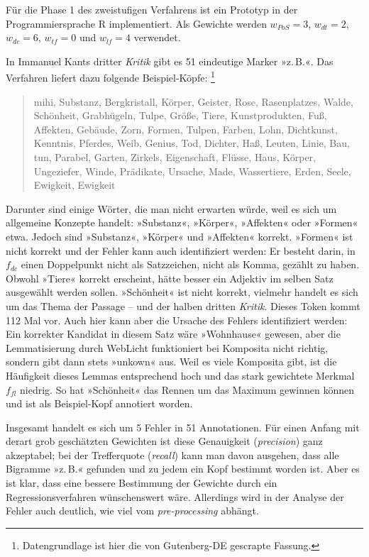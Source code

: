 \documentclass{article}
\newcommand*{\lit}{\textit}%
\newcommand*{\englisch}[1]{\foreignlanguage{english}{\textit{#1}}}%
\begin{document}
Für die Phase 1 des zweistufigen Verfahrens ist ein Prototyp in der
Programmiersprache R implementiert. Als Gewichte werden $w_{PoS}=3$,
$w_{dt}=2$, $w_{dc}=6$, $w_{tf}=0$ und $w_{lf}=4$ verwendet.

In Immanuel Kants dritter \lit{Kritik} gibt es 51 eindeutige Marker
»z.\,B.«. Das Verfahren liefert dazu folgende Beispiel-Köpfe:%
\footnote{Datengrundlage ist hier die von Gutenberg-DE gescrapte
  Fassung.} %
\begin{quote}
  mihi, Substanz, Bergkristall, Körper, Geister, Rose, Rasenplatzes,
  Walde, Schönheit, Grabhügeln, Tulpe, Größe, Tiere, Kunstprodukten,
  Fuß, Affekten, Gebäude, Zorn, Formen, Tulpen, Farben, Lohn,
  Dichtkunst, Kenntnis, Pferdes, Weib, Genius, Tod, Dichter, Haß,
  Leuten, Linie, Bau, tun, Parabel, Garten, Zirkels, Eigenschaft,
  Flüsse, Haus, Körper, Ungeziefer, Winde, Prädikate, Ursache, Made,
  Wassertiere, Erden, Seele, Ewigkeit, Ewigkeit
\end{quote}

Darunter sind einige Wörter, die man nicht erwarten würde, weil es
sich um allgemeine Konzepte handelt: »Substanz«, »Körper«, »Affekten«
oder »Formen« etwa. Jedoch sind »Substanz«, »Körper« und »Affekten«
korrekt. »Formen« ist nicht korrekt und der Fehler kann auch
identifiziert werden: Er besteht darin, in $f_{dc}$ einen Doppelpunkt
nicht als Satzzeichen, nicht als Komma, gezählt zu haben. Obwohl
»Tiere« korrekt erscheint, hätte besser ein Adjektiv im selben Satz
ausgewählt werden sollen. »Schönheit« ist nicht korrekt, vielmehr
handelt es sich um das Thema der Passage -- und der halben dritten
\lit{Kritik}. Dieses Token kommt 112 Mal vor. Auch hier kann aber die
Ursache des Fehlers identifiziert werden: Ein korrekter Kandidat in
diesem Satz wäre »Wohnhause« gewesen, aber die Lemmatisierung durch
WebLicht funktioniert bei Komposita nicht richtig, sondern gibt dann
stets »unkown« aus. Weil es viele Komposita gibt, ist die Häufigkeit
dieses Lemmas entsprechend hoch und das stark gewichtete Merkmal
$f_{fl}$ niedrig. So hat »Schönheit« das Rennen um das Maximum
gewinnen können und ist als Beispiel-Kopf annotiert worden.

Insgesamt handelt es sich um 5 Fehler in 51 Annotationen. Für einen
Anfang mit derart grob geschätzten Gewichten ist diese Genauigkeit
(\englisch{precision}) ganz akzeptabel; bei der Trefferquote
(\englisch{recall}) kann man davon ausgehen, dass alle Bigramme
»z.\,B.« gefunden und zu jedem ein Kopf
bestimmt worden ist. Aber es ist klar, dass eine bessere Bestimmung
der Gewichte durch ein Regressionsverfahren wünschenswert
wäre. Allerdings wird in der Analyse der Fehler auch deutlich, wie
viel vom \englisch{pre-processing} abhängt.
\end{document}
